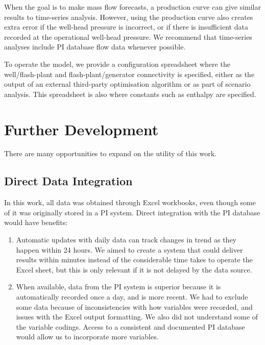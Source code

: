 \documentclass[a4paper, 12pt]{article}
\begin{document}
When the goal is to make mass flow forecasts, a production curve can give similar results to time-series analysis. However, using the production curve also creates extra error if the well-head pressure is incorrect, or if there is insufficient data recorded at the operational well-head pressure. We recommend that time-series analyses include PI database flow data whenever possible.

To operate the model, we provide a configuration spreadsheet where the well/flash-plant and flash-plant/generator connectivity is specified, either as the output of an external third-party optimisation algorithm \cite{Fox:2018} or as part of scenario analysis. This spreadsheet is also where constants such as enthalpy are specified. 


\section{Further Development}
There are many opportunities to expand on the utility of this work.

\subsection{Direct Data Integration}
In this work, all data was obtained through Excel workbooks, even though some of it was originally stored in a PI system. Direct integration with the PI database would have benefits:

\begin{enumerate}
\item Automatic updates with daily data can track changes in trend as they happen within 24 hours.  We aimed to create a system that could deliver results within minutes instead of the considerable time takes to operate the Excel sheet, but this is only relevant if it is not delayed by the data source.
\item When available, data from the PI system is superior because it is automatically recorded once a day, and is more recent. We had to exclude some data because of inconsistencies with how variables were recorded, and issues with the Excel output formatting. We also did not understand some of the variable codings. Access to a consistent and documented PI database would allow us to incorporate more variables.
\end{enumerate}
\end{document}
